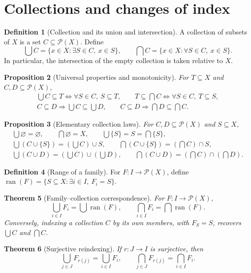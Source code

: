 \documentclass[11pt]{article}
\newtheorem{theorem}{Theorem}[section]
\newtheorem{proposition}[theorem]{Proposition}
\theoremstyle{definition}
\newtheorem{definition}[theorem]{Definition}
\newcommand{\Pow}{\mathcal P}
\begin{document}
\newpage
\section{Collections and changes of index}
\begin{definition}[Collection and its union and intersection]
A collection of subsets of $X$ is a set $C\subseteq\Pow(X)$. Define
\[
\bigcup C=\{x\in X:\exists S\in C,\ x\in S\},\qquad
\bigcap C=\{x\in X:\forall S\in C,\ x\in S\}.
\]
In particular, the intersection of the empty collection is taken relative to $X$.
\end{definition}
\begin{proposition}[Universal properties and monotonicity]
For $T\subseteq X$ and $C,D\subseteq\Pow(X)$,
\begin{gather*}
\bigcup C\subseteq T\iff\forall S\in C,\ S\subseteq T,\qquad
T\subseteq\bigcap C\iff\forall S\in C,\ T\subseteq S,\\
C\subseteq D\Rightarrow\bigcup C\subseteq\bigcup D,\qquad
C\subseteq D\Rightarrow\bigcap D\subseteq\bigcap C.
\end{gather*}
\end{proposition}
\begin{proposition}[Elementary collection laws]
For $C,D\subseteq\Pow(X)$ and $S\subseteq X$,
\begin{gather*}
\bigcup\varnothing=\varnothing,\qquad\bigcap\varnothing=X,\qquad
\bigcup\{S\}=S=\bigcap\{S\},\\
\bigcup(C\cup\{S\})=(\bigcup C)\cup S,\qquad
\bigcap(C\cup\{S\})=(\bigcap C)\cap S,\\
\bigcup(C\cup D)=(\bigcup C)\cup(\bigcup D),\qquad
\bigcap(C\cup D)=(\bigcap C)\cap(\bigcap D).
\end{gather*}
\end{proposition}
\begin{definition}[Range of a family]
For $F:I\to\Pow(X)$, define $\operatorname{ran}(F)=\{S\subseteq X:\exists i\in I,\ F_i=S\}$.
\end{definition}
\begin{theorem}[Family--collection correspondence]
For $F:I\to\Pow(X)$,
\[
\bigcup_{i\in I}F_i=\bigcup\operatorname{ran}(F),\qquad
\bigcap_{i\in I}F_i=\bigcap\operatorname{ran}(F).
\]
Conversely, indexing a collection $C$ by its own members, with $F_S=S$,
recovers $\bigcup C$ and $\bigcap C$.
\end{theorem}
\begin{theorem}[Surjective reindexing]
If $r:J\to I$ is surjective, then
\[
\bigcup_{j\in J}F_{r(j)}=\bigcup_{i\in I}F_i,\qquad
\bigcap_{j\in J}F_{r(j)}=\bigcap_{i\in I}F_i.
\]
\end{theorem}
\end{document}
